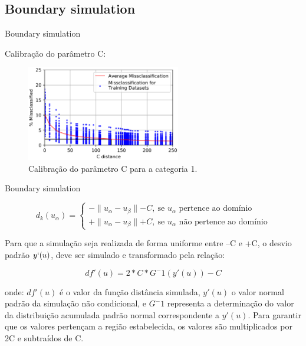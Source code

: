 \documentclass[aspectratio=169]{beamer}
\begin{document}
\subsection{Boundary simulation}

\begin{frame}{Boundary simulation}

Calibração do parâmetro C:

\begin{figure}[H]
	\caption{\label{c_param_1}Calibração do parâmetro C para a categoria 1.}
	\begin{center}
		\includegraphics[width=0.6\textwidth]{capitulo_2/uncert_1.png}
	\end{center}
\end{figure}
\end{frame}

\begin{frame}{Boundary simulation}

	\begin{equation}
	d_k(u_\alpha)=\begin{cases}
	-\parallel u_\alpha-u_\beta\parallel - C,\:\textrm{se $u_\alpha$ pertence ao domínio}\\
	+\parallel u_\alpha-u_\beta\parallel + C,\:\textrm{se $u_\alpha$ não pertence ao domínio}\end{cases}
	\label{C_dist}
	\end{equation}
	
	Para que a simulação seja realizada de forma uniforme entre –C e +C, o desvio padrão $y`(u)$, deve ser simulado e transformado pela relação:
	
	
	\begin{equation}
	df'(u)=2*C*G^-1(y'(u))-C
	\end{equation}
	
	onde: $df'(u)$ é o valor da função distância simulada, $y'(u)$ o valor normal padrão da simulação não condicional, e $G^-1$ representa a determinação do valor da distribuição acumulada padrão normal correspondente a $y'(u)$. Para garantir que os valores pertençam a região estabelecida, os valores são multiplicados por 2C e subtraídos de C.

\end{frame}
\end{document}
